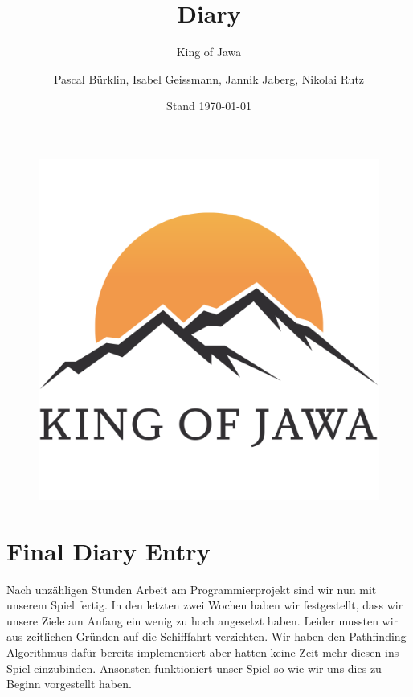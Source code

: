 \documentclass{scrartcl}
\title{Diary}
\subtitle{King of Jawa}
\author{Pascal Bürklin, Isabel Geissmann, Jannik Jaberg, Nikolai Rutz}
\date{Stand \today}
\begin{document}
\maketitle
\begin{figure}[H]
	\includegraphics[width=\linewidth]{LOGO.png}
\end{figure}

\section*{Final Diary Entry}
Nach unzähligen Stunden Arbeit am Programmierprojekt sind wir nun mit unserem Spiel fertig. In den letzten zwei Wochen haben wir festgestellt, dass wir unsere Ziele am Anfang ein wenig zu hoch angesetzt haben. Leider mussten wir aus zeitlichen Gründen auf die Schifffahrt verzichten. Wir haben den Pathfinding Algorithmus dafür bereits implementiert aber hatten keine Zeit mehr diesen ins Spiel einzubinden. Ansonsten funktioniert unser Spiel so wie wir uns dies zu Beginn vorgestellt haben. 
\end{document}
